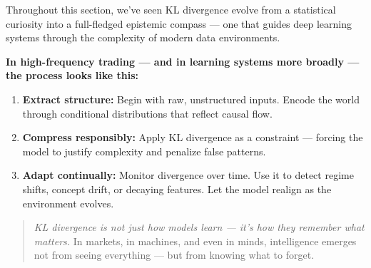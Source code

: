 Throughout this section, we’ve seen KL divergence evolve from a statistical curiosity into a full-fledged epistemic compass — one that guides deep learning systems through the complexity of modern data environments.

\textbf{In high-frequency trading — and in learning systems more broadly — the process looks like this:}

\begin{enumerate}
    \item \textbf{Extract structure:} Begin with raw, unstructured inputs. Encode the world through conditional distributions that reflect causal flow.
    
    \item \textbf{Compress responsibly:} Apply KL divergence as a constraint — forcing the model to justify complexity and penalize false patterns.
    
    \item \textbf{Adapt continually:} Monitor divergence over time. Use it to detect regime shifts, concept drift, or decaying features. Let the model realign as the environment evolves.
\end{enumerate}

\begin{quote}
\textit{KL divergence is not just how models learn — it's how they remember what matters.} In markets, in machines, and even in minds, intelligence emerges not from seeing everything — but from knowing what to forget.
\end{quote}
